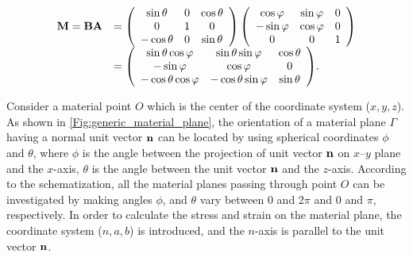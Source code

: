 \begin{eqnarray}
\begin{array}{*{20}{l}}
{{\bf{M}} = {\bf{BA}}}&{ = \left( {\begin{array}{*{20}{c}}
{\sin \theta }&0&{\cos \theta }\\
0&1&0\\
{ - \cos \theta }&0&{\sin \theta }
\end{array}} \right)\left( {\begin{array}{*{20}{c}}
{\cos \varphi }&{\sin \varphi }&0\\
{ - \sin \varphi }&{\cos \varphi }&0\\
0&0&1
\end{array}} \right)}\\
{}&{ = \left( {\begin{array}{*{20}{c}}
{\sin \theta \cos \varphi }&{\sin \theta \sin \varphi }&{\cos \theta }\\
{ - \sin \varphi }&{\cos \varphi }&0\\
{ - \cos \theta \cos \varphi }&{ - \cos \theta \sin \varphi }&{\sin \theta }
\end{array}} \right)}.
\end{array}
\label{Equ:transformation_matrix}
\end{eqnarray}

Consider a material point $O$ which is the center of the coordinate system ($x,y,z$). As shown in \ref{Fig:generic_material_plane}, the orientation of a material plane $\Gamma$ having a normal unit vector ${\bf{n}}$ can be located by using spherical coordinates $\phi$ and $\theta$, where $\phi$ is the angle between the projection of unit vector ${\bf{n}}$ on $x–y$ plane and the $x$-axis, $\theta$ is the angle between the unit vector ${\bf{n}}$ and the $z$-axis. According to the schematization, all the material planes passing through point $O$ can be investigated by making angles $\phi$, and $\theta$ vary between 0 and 2$\pi$ and 0 and $\pi$, respectively. In order to calculate the stress and strain on the material plane, the coordinate system ($n,a,b$) is introduced, and the $n$-axis is parallel to the unit vector ${\bf{n}}$.

